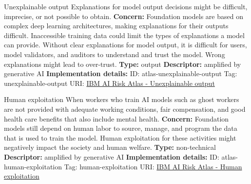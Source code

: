 \begin{definitionbox}{Unexplainable output}
Explanations for model output decisions might be difficult, imprecise, or not possible to obtain.\newline\newline
\textbf{Concern: }Foundation models are based on complex deep learning architectures, making explanations for their outputs difficult. Inaccessible training data could limit the types of explanations a model can provide. Without clear explanations for model output, it is difficult for users, model validators, and auditors to understand and trust the model. Wrong explanations might lead to over-trust.\newline\newline
\textbf{Type: }output\newline
\textbf{Descriptor: }amplified by generative AI \newline\newline
\textbf{Implementation details: } \newline
ID: atlas-unexplainable-output \newline
Tag: unexplainable-output \newline
URI:  \href{https://www.ibm.com/docs/en/watsonx/saas?topic=SSYOK8/wsj/ai-risk-atlas/unexplainable-output.html}{IBM AI Risk Atlas - Unexplainable output}\newline
\end{definitionbox}
\begin{definitionbox}{Human exploitation}
When workers who train AI models such as ghost workers are not provided with adequate working conditions, fair compensation, and good health care benefits that also include mental health.\newline\newline
\textbf{Concern: }Foundation models still depend on human labor to source, manage, and program the data that is used to train the model. Human exploitation for these activities might negatively impact the society and human welfare. \newline\newline
\textbf{Type: }non-technical\newline
\textbf{Descriptor: }amplified by generative AI \newline\newline
\textbf{Implementation details: } \newline
ID: atlas-human-exploitation \newline
Tag: human-exploitation \newline
URI:  \href{https://www.ibm.com/docs/en/watsonx/saas?topic=SSYOK8/wsj/ai-risk-atlas/human-exploitation.html}{IBM AI Risk Atlas - Human exploitation}\newline
\end{definitionbox}
